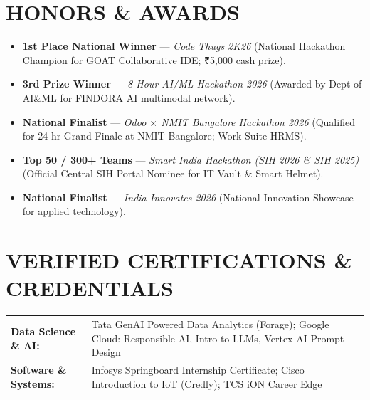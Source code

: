\documentclass[a4paper,10pt]{article}
\begin{document}
\section{HONORS \& AWARDS}
\begin{itemize}
    \item \textbf{1st Place National Winner} --- \textit{Code Thugs 2K26} (National Hackathon Champion for GOAT Collaborative IDE; ₹5,000 cash prize).
    \item \textbf{3rd Prize Winner} --- \textit{8-Hour AI/ML Hackathon 2026} (Awarded by Dept of AI\&ML for FINDORA AI multimodal network).
    \item \textbf{National Finalist} --- \textit{Odoo $\times$ NMIT Bangalore Hackathon 2026} (Qualified for 24-hr Grand Finale at NMIT Bangalore; Work Suite HRMS).
    \item \textbf{Top 50 / 300+ Teams} --- \textit{Smart India Hackathon (SIH 2026 \& SIH 2025)} (Official Central SIH Portal Nominee for IT Vault \& Smart Helmet).
    \item \textbf{National Finalist} --- \textit{India Innovates 2026} (National Innovation Showcase for applied technology).
\end{itemize}

\section{VERIFIED CERTIFICATIONS \& CREDENTIALS}
\begin{tabular}{@{}p{1.30in}p{6.15in}@{}}
\textbf{Data Science \& AI:} & Tata GenAI Powered Data Analytics (Forage); Google Cloud: Responsible AI, Intro to LLMs, Vertex AI Prompt Design \\
\textbf{Software \& Systems:} & Infosys Springboard Internship Certificate; Cisco Introduction to IoT (Credly); TCS iON Career Edge \\
\end{tabular}
\end{document}
